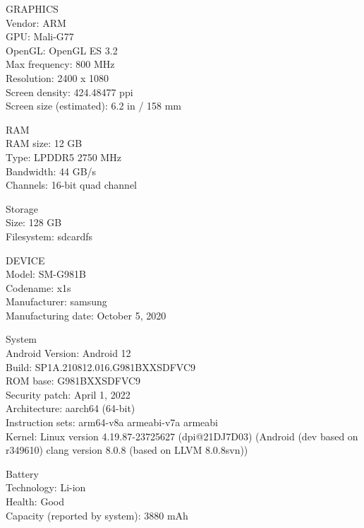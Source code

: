 \documentclass[12pt,a4paper]{report}
\begin{document}
\par

GRAPHICS \\
Vendor: ARM \\
GPU: Mali-G77 \\
OpenGL: OpenGL ES 3.2 \\
Max frequency: 800 MHz \\
Resolution: 2400 x 1080 \\
Screen density: 424.48477 ppi \\
Screen size (estimated): 6.2 in / 158 mm

\par

RAM \\
RAM size: 12 GB \\
Type: LPDDR5 2750 MHz \\
Bandwidth: 44 GB/s \\
Channels: 16-bit quad channel

\par

Storage \\
Size: 128 GB \\
Filesystem: sdcardfs \\

\par

DEVICE \\
Model: SM-G981B \\
Codename: x1s \\
Manufacturer: samsung \\
Manufacturing date: October 5, 2020

\par

System \\
Android Version: Android 12 \\
Build: SP1A.210812.016.G981BXXSDFVC9 \\
ROM base: G981BXXSDFVC9 \\
Security patch: April 1, 2022 \\
Architecture: aarch64 (64-bit) \\
Instruction sets: arm64-v8a armeabi-v7a armeabi \\
Kernel: Linux version 4.19.87-23725627 (dpi@21DJ7D03) (Android (dev based on r349610)
clang version 8.0.8 (based on LLVM 8.0.8svn))

\par

Battery \\
Technology: Li-ion \\
Health: Good \\
Capacity (reported by system): 3880 mAh
\end{document}
